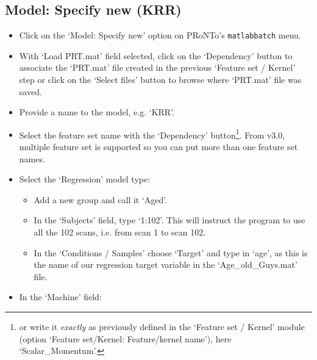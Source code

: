
\subsection{Model: Specify new (KRR)}
\label{ssec: model_spec_new_krr}


\begin{itemize}

\item Click on the `Model: Specify new' option on PRoNTo's {\tt matlabbatch} menu.

\item With `Load PRT.mat' field selected, click on the `Dependency' button to associate the `PRT.mat' file created in the previous `Feature set / Kernel' step or click on the `Select files' button to browse where `PRT.mat' file was saved.

\item Provide a name to the model, e.g. `KRR'.

\item Select the feature set name with the `Dependency' button\footnote{or write it {\it exactly} as previously defined in the `Feature set / Kernel' module (option `Feature set/Kernel: Feature/kernel name'), here `Scalar\_Momentum'.}. From v3.0, multiple feature set is supported so you can put more than one feature set names.
    
\item Select the `Regression' model type:

    \begin{itemize}
    
    \item Add a new group and call it `Aged'.
    
    \item In the `Subjects' field, type `1:102'. This will instruct the program to use all the 102 scans, i.e. from scan 1 to scan 102.
    
    \item In the `Conditions / Samples' choose `Target' and type in `age', as this is the name of our regression target variable in the `Age\_old\_Guys.mat' file.
       
    \end{itemize}
    
    \item In the `Machine' field: 
    
    \begin{itemize}


\end{itemize}
\end{itemize}
